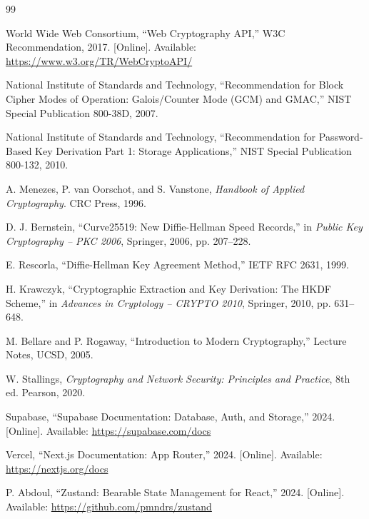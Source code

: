 \renewcommand{\bibname}{References}
\begin{thebibliography}{99}

World Wide Web Consortium, ``Web Cryptography API,'' W3C Recommendation, 2017. [Online]. Available: \url{https://www.w3.org/TR/WebCryptoAPI/}

National Institute of Standards and Technology, ``Recommendation for Block Cipher Modes of Operation: Galois/Counter Mode (GCM) and GMAC,'' NIST Special Publication 800-38D, 2007.

National Institute of Standards and Technology, ``Recommendation for Password-Based Key Derivation Part 1: Storage Applications,'' NIST Special Publication 800-132, 2010.

A. Menezes, P. van Oorschot, and S. Vanstone, \textit{Handbook of Applied Cryptography}. CRC Press, 1996.

D. J. Bernstein, ``Curve25519: New Diffie-Hellman Speed Records,'' in \textit{Public Key Cryptography -- PKC 2006}, Springer, 2006, pp. 207--228.

E. Rescorla, ``Diffie-Hellman Key Agreement Method,'' IETF RFC 2631, 1999.

H. Krawczyk, ``Cryptographic Extraction and Key Derivation: The HKDF Scheme,'' in \textit{Advances in Cryptology -- CRYPTO 2010}, Springer, 2010, pp. 631--648.

M. Bellare and P. Rogaway, ``Introduction to Modern Cryptography,'' Lecture Notes, UCSD, 2005.

W. Stallings, \textit{Cryptography and Network Security: Principles and Practice}, 8th ed. Pearson, 2020.

Supabase, ``Supabase Documentation: Database, Auth, and Storage,'' 2024. [Online]. Available: \url{https://supabase.com/docs}

Vercel, ``Next.js Documentation: App Router,'' 2024. [Online]. Available: \url{https://nextjs.org/docs}

P. Abdoul, ``Zustand: Bearable State Management for React,'' 2024. [Online]. Available: \url{https://github.com/pmndrs/zustand}

\end{thebibliography}

